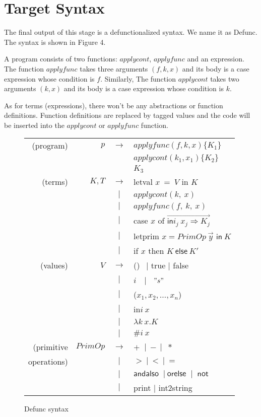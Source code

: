 \documentclass{article}
\theoremstyle{definition}
\theoremstyle{remark}
\numberwithin{equation}{section}
\begin{document}
\section{Target Syntax}

The final output of this stage is a defunctionalized syntax.
We name it as Defunc. The syntax is shown in Figure 4.

A program consists of two functions: $applycont$, $applyfunc$ and an expression.
The function $applyfunc$ takes three arguments $(f, k, x)$ and its body is a case
expression whose condition is $f$. Similarly, The function $applycont$ takes two
arguments $(k, x)$ and its body is a case expression whose condition is $k$.

As for terms (expressions), there won't be any abstractions or function definitions.
Function definitions are replaced by tagged values and the code will be inserted into
the $applycont$ or $applyfunc$ function.

\begin{figure}[!ht]
  \centering
\begin{tabular}{rrcl}
(program) & $p$ & $\to$ & $applyfunc(f, k, x)\{K_1\}$\\
        &       &       & $applycont(k_1, x_1)\{K_2\}$\\
        &       &       &  $K_3$\\

(terms) & $K, T$ & $\to$ & \textsf{letval }$x\ =\ V$ \textsf{ in } $K$ \\
        &     & $|$ &  $applycont(k,\ x)$ \\
        &     & $|$ &  $applyfunc(f,\ k,\ x)$ \\
        &     & $|$ & \textsf{case} $x$ \textsf{of}
             $\overrightarrow{\textsf{in}i_j\ x_j \Rightarrow K_j}$\\
        &     & $|$ & \textsf{letprim} $x=PrimOp\ \vec{y}
         \textsf{ in}\ K$\\
        &     & $|$ &\textsf{if} $x$ \textsf{then} $K\ \textsf{else}\ K'$\\

(values) & $V$ & $\to$ & () $\ \ |$ \textsf{ true } $|$ \textsf{ false}\\
        &     & $|$ & $i\ \ $ $\ |\ $  $\ "s"$\\
        &     & $|$ & ($x_1,x_2, ..., x_n$)\\
        &     & $|$ & \textsf{in}$i\ x$\\
        &     & $|$ &  $\lambda k\ x.K$ \\
        &     & $|$ &  $\texttt{\#}i\ x$ \\

(primitive & $PrimOp$ & $\to$ & $+\ $ $|\ -\ |$ $\ *$\\
operations) &     & $|$ & $>\ |\ <\ |\ =$\\
        &     & $|$ & $\textsf{andalso }\ |\ \textsf{orelse }\ |\ \textsf{ not}$\\
        &     & $|$ & \textsf{print} $|$ \textsf{int2string}\\
\end{tabular}
  \caption{Defunc syntax}
  \label{fig-sub}
\end{figure}
\end{document}
